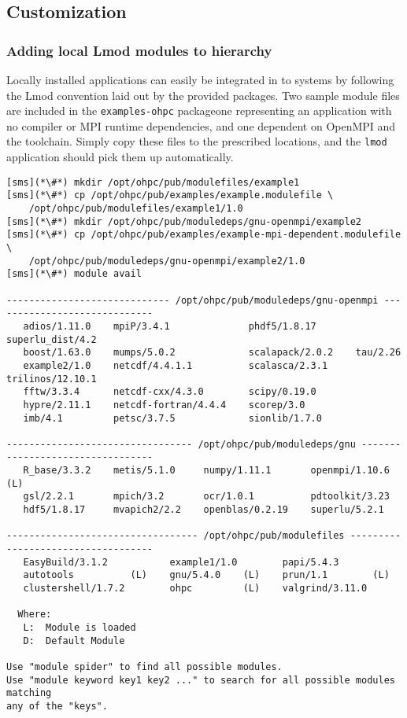 \clearpage

\subsection{Customization} \label{appendix:customization}

\subsubsection{Adding local Lmod modules to \OHPC{} hierarchy} \label{appendix:modulefiles}
Locally installed applications can easily be integrated in to \OHPC{} systems by
following the Lmod convention laid out by the provided packages. Two sample
module files are included in the \texttt{examples-ohpc} package\textemdash one
representing an application with no compiler or MPI runtime dependencies, and
one dependent on OpenMPI and the \GNU{} toolchain. Simply copy these files to the
prescribed locations, and the \texttt{lmod} application should pick them up
automatically.

\begin{lstlisting}[alsoletter={/,.},morekeywords={example1/1.0, example2/1.0}]
[sms](*\#*) mkdir /opt/ohpc/pub/modulefiles/example1
[sms](*\#*) cp /opt/ohpc/pub/examples/example.modulefile \
    /opt/ohpc/pub/modulefiles/example1/1.0
[sms](*\#*) mkdir /opt/ohpc/pub/moduledeps/gnu-openmpi/example2
[sms](*\#*) cp /opt/ohpc/pub/examples/example-mpi-dependent.modulefile \
    /opt/ohpc/pub/moduledeps/gnu-openmpi/example2/1.0
[sms](*\#*) module avail

----------------------------- /opt/ohpc/pub/moduledeps/gnu-openmpi -----------------------------
   adios/1.11.0    mpiP/3.4.1              phdf5/1.8.17       superlu_dist/4.2
   boost/1.63.0    mumps/5.0.2             scalapack/2.0.2    tau/2.26
   example2/1.0    netcdf/4.4.1.1          scalasca/2.3.1     trilinos/12.10.1
   fftw/3.3.4      netcdf-cxx/4.3.0        scipy/0.19.0
   hypre/2.11.1    netcdf-fortran/4.4.4    scorep/3.0
   imb/4.1         petsc/3.7.5             sionlib/1.7.0

--------------------------------- /opt/ohpc/pub/moduledeps/gnu ---------------------------------
   R_base/3.3.2    metis/5.1.0     numpy/1.11.1       openmpi/1.10.6 (L)
   gsl/2.2.1       mpich/3.2       ocr/1.0.1          pdtoolkit/3.23
   hdf5/1.8.17     mvapich2/2.2    openblas/0.2.19    superlu/5.2.1

---------------------------------- /opt/ohpc/pub/modulefiles -----------------------------------
   EasyBuild/3.1.2           example1/1.0        papi/5.4.3
   autotools          (L)    gnu/5.4.0    (L)    prun/1.1        (L)
   clustershell/1.7.2        ohpc         (L)    valgrind/3.11.0

  Where:
   L:  Module is loaded
   D:  Default Module

Use "module spider" to find all possible modules.
Use "module keyword key1 key2 ..." to search for all possible modules matching
any of the "keys".
\end{lstlisting}

